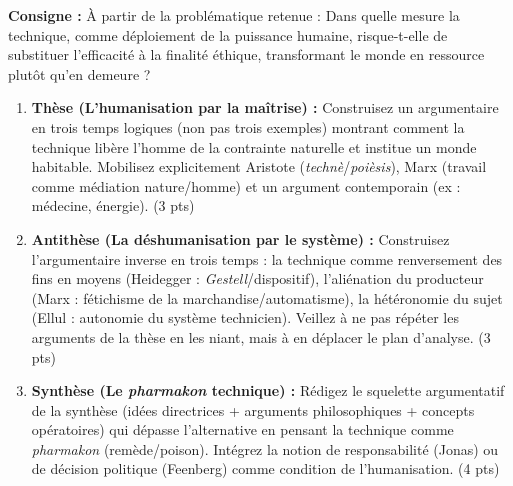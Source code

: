 \documentclass[11pt]{article}
\begin{document}
\begin{exercice}
\textbf{Consigne :} À partir de la problématique retenue : \og Dans quelle mesure la technique, comme déploiement de la puissance humaine, risque-t-elle de substituer l'efficacité à la finalité éthique, transformant le monde en ressource plutôt qu'en demeure ? \fg

\begin{enumerate}
    \item \textbf{Thèse (L'humanisation par la maîtrise) :} Construisez un argumentaire en trois temps logiques (non pas trois exemples) montrant comment la technique libère l'homme de la contrainte naturelle et institue un monde habitable. Mobilisez explicitement Aristote (\textit{technè}/\textit{poièsis}), Marx (travail comme médiation nature/homme) et un argument contemporain (ex : médecine, énergie). (3 pts)
    \item \textbf{Antithèse (La déshumanisation par le système) :} Construisez l'argumentaire inverse en trois temps : la technique comme renversement des fins en moyens (Heidegger : \textit{Gestell}/dispositif), l'aliénation du producteur (Marx : fétichisme de la marchandise/automatisme), la hétéronomie du sujet (Ellul : autonomie du système technicien). Veillez à ne pas répéter les arguments de la thèse en les niant, mais à en déplacer le plan d'analyse. (3 pts)
    \item \textbf{Synthèse (Le \textit{pharmakon} technique) :} Rédigez le squelette argumentatif de la synthèse (idées directrices + arguments philosophiques + concepts opératoires) qui dépasse l'alternative en pensant la technique comme \textit{pharmakon} (remède/poison). Intégrez la notion de \og responsabilité \fg (Jonas) ou de \og décision politique \fg (Feenberg) comme condition de l'humanisation. (4 pts)
\end{enumerate}
\end{exercice}
\end{document}
